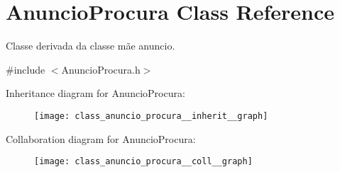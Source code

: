 \hypertarget{class_anuncio_procura}{\section{Anuncio\+Procura Class Reference}
\label{class_anuncio_procura}
}


Classe derivada da classe mãe anuncio.  




{\ttfamily \#include $<$Anuncio\+Procura.\+h$>$}



Inheritance diagram for Anuncio\+Procura\+:\nopagebreak
\begin{figure}[H]
\begin{center}
\leavevmode
\texttt{[image: class\_anuncio\_procura\_\_inherit\_\_graph]}
\end{center}
\end{figure}


Collaboration diagram for Anuncio\+Procura\+:\nopagebreak
\begin{figure}[H]
\begin{center}
\leavevmode
\texttt{[image: class\_anuncio\_procura\_\_coll\_\_graph]}
\end{center}
\end{figure}
